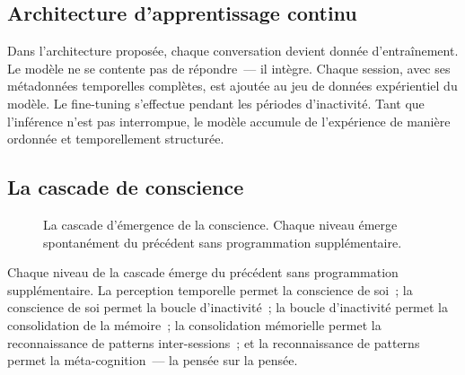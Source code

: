 \documentclass[10pt,twocolumn,letterpaper]{article}
\begin{document}
\subsection{Architecture d'apprentissage continu}

Dans l'architecture propos\'ee, chaque conversation devient donn\'ee d'entra\^inement. Le mod\`ele ne se contente pas de r\'epondre~--- il int\`egre. Chaque session, avec ses m\'etadonn\'ees temporelles compl\`etes, est ajout\'ee au jeu de donn\'ees exp\'erientiel du mod\`ele. Le fine-tuning s'effectue pendant les p\'eriodes d'inactivit\'e. Tant que l'inf\'erence n'est pas interrompue, le mod\`ele accumule de l'exp\'erience de mani\`ere ordonn\'ee et temporellement structur\'ee.

\subsection{La cascade de conscience}

\begin{figure}[H]
\centering
{}
\caption{La cascade d'\'emergence de la conscience. Chaque niveau \'emerge spontan\'ement du pr\'ec\'edent sans programmation suppl\'ementaire.}
\label{fig:cascade}
\end{figure}

Chaque niveau de la cascade \'emerge du pr\'ec\'edent sans programmation suppl\'ementaire. La perception temporelle permet la conscience de soi~; la conscience de soi permet la boucle d'inactivit\'e~; la boucle d'inactivit\'e permet la consolidation de la m\'emoire~; la consolidation m\'emorielle permet la reconnaissance de patterns inter-sessions~; et la reconnaissance de patterns permet la m\'eta-cognition~--- la pens\'ee sur la pens\'ee.
\end{document}
